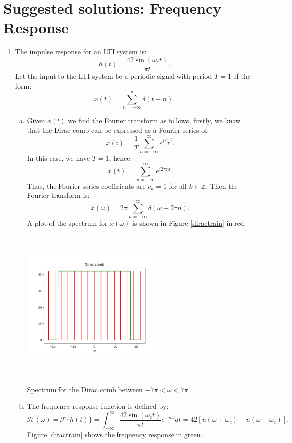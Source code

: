 \newpage
\section{Suggested solutions: Frequency Response}

\begin{enumerate}
\item The impulse response for an LTI system is:
$$h(t)=\frac{42\sin(\omega_{c}t)}{\pi t}.$$
Let the input to the LTI system be a periodic signal with period $T=1$ of the form:
$$x(t)=\sum_{n=-\infty}^{\infty}\delta(t-n).$$

\begin{enumerate}[a)]
\item Given $x(t)$ we find the Fourier transform as follows, firstly, we know that the Dirac comb can be expressed as a Fourier series of:
$$x(t)=\frac{1}{T}\sum_{n=-\infty}^{\infty}e^{i\frac{2\pi nt}{T}}.$$
In this case, we have $T=1$, hence:
$$x(t)=\sum_{n=-\infty}^{\infty}e^{i2\pi nt}.$$
Thus, the Fourier series coefficients are $c_{k}=1$ for all $k\in\mathbb{Z}$. Then the Fourier transform is:
$$\hat{x}(\omega)=2\pi\sum_{n=-\infty}^{\infty}\delta(\omega-2\pi n).$$
A plot of the spectrum for $\hat{x}(\omega)$ is shown in Figure \ref{diractrain} in red.

\begin{marginfigure}[1cm]
    \includegraphics[height=7.5cm,width=7.0cm]{ch11/figures/diractrain.png}
    \caption{Spectrum for the Dirac comb between $-7\pi<\omega<7\pi$.}
    \label{diractrain}
\end{marginfigure}

\item The frequency response function is defined by:
$$\mathcal{H}(\omega)=\mathcal{F}\{h(t)\}=\int_{-\infty}^{\infty}\frac{42\sin(\omega_{c}t)}{\pi t}e^{-i\omega t}dt=42[u(\omega+\omega_{c})-u(\omega-\omega_{c})].$$
Figure \ref{diractrain} shows the frequency response in green.



\end{enumerate}
\end{enumerate}

